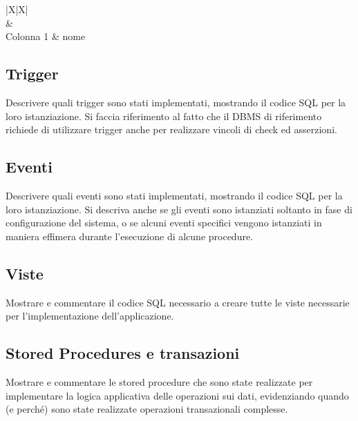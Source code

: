 \begin{tabularx}{\linewidth}{|X|X|}
    \hline
     \\\hline
     & 
    \\\hline
    Colonna 1
     & \textlangle{}nome\textrangle{}
    \\ \hline
\end{tabularx}

\subsection*{Trigger}

\begin{templateblock}
    Descrivere quali trigger sono stati implementati, mostrando il codice SQL
    per la loro istanziazione. Si faccia riferimento al fatto che il DBMS di
    riferimento richiede di utilizzare trigger anche per realizzare vincoli di
    check ed asserzioni.
\end{templateblock}

\subsection*{Eventi}

\begin{templateblock}
    Descrivere quali eventi sono stati implementati, mostrando il codice SQL
    per la loro istanziazione. Si descriva anche se gli eventi sono
    istanziati soltanto in fase di configurazione del sistema, o se alcuni
    eventi specifici vengono istanziati in maniera effimera durante
    l’esecuzione di alcune procedure.
\end{templateblock}

\subsection*{Viste}

\begin{templateblock}
    Mostrare e commentare il codice SQL necessario a creare tutte le viste
    necessarie per l’implementazione dell’applicazione.
\end{templateblock}

\subsection*{Stored Procedures e transazioni}

\begin{templateblock}
    Mostrare e commentare le stored procedure che sono state realizzate per
    implementare la logica applicativa delle operazioni sui dati, evidenziando
    quando (e perché) sono state realizzate operazioni transazionali complesse.
\end{templateblock}
